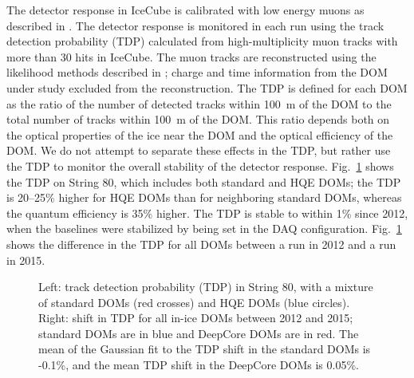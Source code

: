 The detector response in IceCube is calibrated with low energy muons as
described in \cite{IC3:ereco}. The detector response is monitored in each run using the track
detection probability (TDP) calculated from high-multiplicity muon tracks
with more than 30 hits in IceCube. The muon 
tracks are reconstructed using the likelihood methods described in
\cite{IC3:ereco}; charge and time information from the DOM under study excluded
from the reconstruction. The TDP is
defined for each DOM as the ratio of the number of detected tracks
within 100~m of the DOM to the total number of tracks within 100~m of
the DOM. This ratio depends both on the optical properties of the ice
near the DOM and the optical efficiency of the DOM. We do not attempt
to separate
these effects in the TDP, but rather use the TDP to monitor the
overall stability of the detector response. Fig.~\ref{fig:tdp} shows the TDP on
String 80, which includes both standard and HQE DOMs; the TDP is
20--25\% higher for HQE DOMs than for neighboring standard
DOMs, whereas the quantum efficiency is 35\% higher. The TDP is stable to within 1\% since 2012, when the baselines
were stabilized by being set in the DAQ configuration. Fig.~\ref{fig:tdp} shows
the difference in the TDP for all DOMs between a run in 2012 and a run
in 2015.

\begin{figure}[!h]
  \captionsetup[subfigure]{labelformat=empty}
  \centering
  \caption{Left: track detection probability (TDP) in String 80, with a
    mixture of standard DOMs (red crosses) and HQE DOMs (blue
    circles). Right: shift in TDP for all in-ice DOMs between 2012 and 2015; standard DOMs are in blue and
    DeepCore DOMs are in red. The mean of the Gaussian fit to
    the TDP shift in the standard DOMs is -0.1\%, and the mean 
    TDP shift in the DeepCore DOMs is 0.05\%.}
  \label{fig:tdp}
\end{figure}

